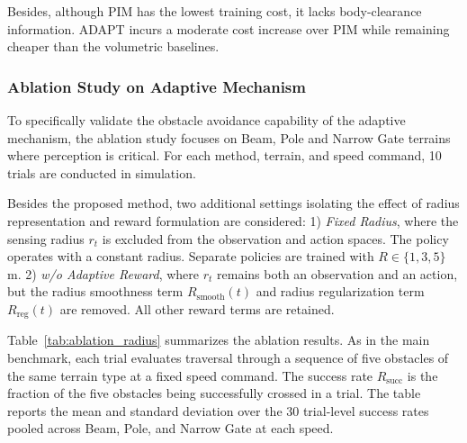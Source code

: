 \documentclass[letterpaper, 10 pt, conference]{ieeeconf/ieeeconf}
\DeclareRobustCommand{\RevisionAdd}[1]{{\color{red}#1}}
\begin{document}
\RevisionAdd{Besides, although PIM has the lowest training cost, it lacks body-clearance information. ADAPT incurs a moderate cost increase over PIM while remaining cheaper than the volumetric baselines}.

\subsubsection{Ablation Study on Adaptive Mechanism}
To specifically validate the obstacle avoidance capability of the adaptive mechanism, the ablation study focuses on Beam, Pole and Narrow Gate terrains where perception is critical. \RevisionAdd{For each method, terrain, and speed command, 10 trials are conducted in simulation. 
}

Besides the proposed method, two additional settings isolating the effect of radius representation and reward formulation are considered:
1) \textit{Fixed Radius}, where the sensing radius $r_t$ is excluded from the observation and action spaces. The policy operates with a constant radius. Separate policies are trained with $R \in \{1, 3, 5\}$\,m.
2) \textit{w/o Adaptive Reward}, where $r_t$ \RevisionAdd{remains }both an observation and an action, \RevisionAdd{but the radius smoothness term $R_{\mathrm{smooth}}(t)$
and radius regularization term $R_{\mathrm{reg}}(t)$ are removed. All other reward terms are retained}.

Table~\ref{tab:ablation_radius} summarizes the ablation results. \RevisionAdd{As in the main benchmark, each trial evaluates traversal through a sequence of five obstacles of the same terrain type at a fixed speed command. The success rate $R_{\mathrm{succ}}$ is the fraction of the five obstacles being successfully crossed in a trial. The table reports the mean and standard deviation over the 30 trial-level success rates pooled across Beam, Pole, and Narrow Gate at each speed}.
\end{document}
